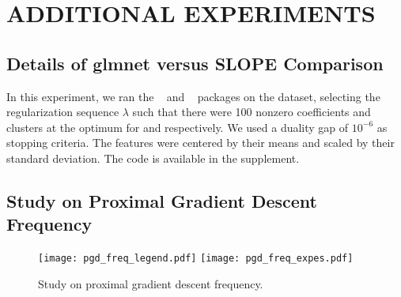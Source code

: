 \section{ADDITIONAL EXPERIMENTS}\label{sec:add_expes}

\subsection{Details of \textsf{glmnet} versus \textsf{SLOPE} Comparison}
\label{sec:slope-vs-glmnet}

In this experiment, we ran the ~\parencite{friedman2022} and ~\parencite{larsson2022d} packages on the  dataset, selecting the regularization sequence \(\lambda\) such that there were 100 nonzero coefficients and clusters at the optimum for  and  respectively.
We used a duality gap of \(10^{-6}\) as stopping criteria.
The features were centered by their means and scaled by their standard deviation.
The code is available in the supplement.

\subsection{Study on Proximal Gradient Descent Frequency}

\begin{figure*}[htb]
  \centering
  \texttt{[image: pgd\_freq\_legend.pdf]}
  \texttt{[image: pgd\_freq\_expes.pdf]}
  \caption{Study on proximal gradient descent frequency.}
  \label{fig:pgd_freq}
\end{figure*}
